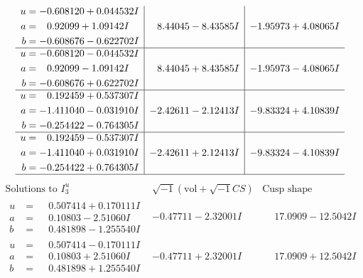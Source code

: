 \documentclass[1p]{elsarticle_modified}
\theoremstyle{definition}
\newcommand{\I}{\sqrt{-1}}
\begin{document}
$$\begin{array}{c|c|c}
\begin{aligned}
u &= -0.608120 + 0.044532 I \\
a &= \phantom{-}0.92099 + 1.09142 I \\
b &= -0.608676 - 0.622702 I\end{aligned}
 & \phantom{-}8.44045 - 8.43585 I & -1.95973 + 4.08065 I \\ \hline\begin{aligned}
u &= -0.608120 - 0.044532 I \\
a &= \phantom{-}0.92099 - 1.09142 I \\
b &= -0.608676 + 0.622702 I\end{aligned}
 & \phantom{-}8.44045 + 8.43585 I & -1.95973 - 4.08065 I \\ \hline\begin{aligned}
u &= \phantom{-}0.192459 + 0.537307 I \\
a &= -1.411040 - 0.031910 I \\
b &= -0.254422 - 0.764305 I\end{aligned}
 & -2.42611 - 2.12413 I & -9.83324 + 4.10839 I \\ \hline\begin{aligned}
u &= \phantom{-}0.192459 - 0.537307 I \\
a &= -1.411040 + 0.031910 I \\
b &= -0.254422 + 0.764305 I\end{aligned}
 & -2.42611 + 2.12413 I & -9.83324 - 4.10839 I\\
 \hline 
 \end{array}$$\newpage$$\begin{array}{c|c|c}  
\text{Solutions to }I^u_{3}& \I (\text{vol} + \sqrt{-1}CS) & \text{Cusp shape}\\
 \hline 
\begin{aligned}
u &= \phantom{-}0.507414 + 0.170111 I \\
a &= \phantom{-}0.10803 - 2.51060 I \\
b &= \phantom{-}0.481898 - 1.255540 I\end{aligned}
 & -0.47711 - 2.32001 I & \phantom{-}17.0909 - 12.5042 I \\ \hline\begin{aligned}
u &= \phantom{-}0.507414 - 0.170111 I \\
a &= \phantom{-}0.10803 + 2.51060 I \\
b &= \phantom{-}0.481898 + 1.255540 I\end{aligned}
 & -0.47711 + 2.32001 I & \phantom{-}17.0909 + 12.5042 I \\ \hline\begin{aligned}

\end{aligned}
\end{array}$$
\end{document}

